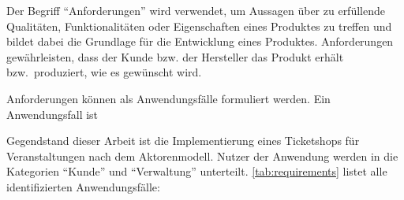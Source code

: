 Der Begriff \enquote{Anforderungen} wird verwendet, um Aussagen über zu erfüllende Qualitäten, Funktionalitäten oder Eigenschaften eines Produktes zu treffen und bildet dabei die Grundlage für die Entwicklung eines Produktes.
Anforderungen gewährleisten, dass der Kunde bzw. der Hersteller das Produkt erhält bzw.\ produziert, wie es gewünscht wird.\unskip{}

Anforderungen können als Anwendungsfälle formuliert werden.
Ein Anwendungsfall ist 

Gegendstand dieser Arbeit ist die Implementierung eines Ticketshops für Veranstaltungen nach dem Aktorenmodell.
Nutzer der Anwendung werden in die Kategorien \enquote{Kunde} und \enquote{Verwaltung} unterteilt.
\autoref{tab:requirements} listet alle identifizierten Anwendungsfälle:

